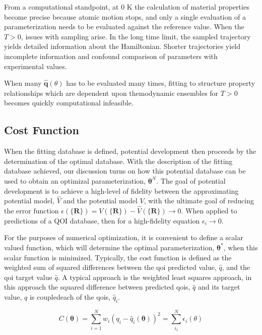 From a computational standpoint, at $0$ K the calculation of material properties become precise because atomic motion stops, and only a single evaluation of a parameterization needs to be evaluated against the reference value.  When the $T>0$, issues with sampling arise.  In the long time limit, the sampled trajectory yields detailed information about the Hamiltonian.  Shorter trajectories yield incomplete information and confound comparison of parameters with experimental values.

When many $\hat{\bm{q}}(\theta)$ has to be evaluated many times, fitting to structure property relationships which are dependent upon themodynamic ensembles for $T>0$ becomes quickly computational infeasible.
\subsection{Cost Function}
\label{subsec:cost_function}

When the fitting database is defined, potential development then proceeds by the determination of the optimal database.
With the description of the fitting database achieved, our discussion turns on how this potential database can be used to obtain an optimizal parameterization, $\bm{\theta}^N$.
The goal of potential development is to achieve a high-level of fidelity between the approximating potential model, $\hat{V}$ and the potential model $V$, with the ultimate goal of reducing the error function $\epsilon(\{\bm{R}\})=V(\{\bm{R}\})-\hat{V}(\{\bm{R}\}) \rightarrow 0$.  When applied to predictions of a QOI database, then for a high-fidelity equation $\epsilon_i \rightarrow 0$.

For the purposes of numerical optimization, it is convenient to define a scalar valued function, which will determine the optimal parameterization, $\bm{\theta}^*$, when this scalar function is minimized.  Typically, the cost function is defined as the weighted sum of squared differences between the qoi predicted value, $\hat{q}$, and the qoi target value $\hat{q}$.
A typical approach is the weighted least squares approach, in this approach the squared difference between predicted qois, $\hat{q}$ and its target value, $q$ is coupledeach of the qois, $\hat{q}_i$.

\begin{equation}
\label{eq:cost_function}
	C(\bm{\theta})= \sum_{i=1}^{N}w_i\left(q_i-\hat{q}_i(\bm{\theta})\right)^2 = \sum_{i_1}^N \epsilon_i(\theta)
\end{equation}

